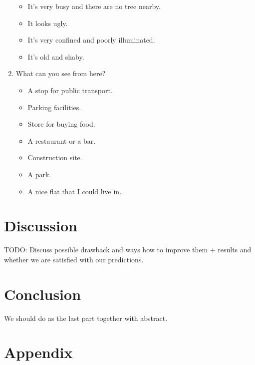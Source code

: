 \documentclass[letterpaper]{article}
\begin{document}
\begin{enumerate}
\begin{itemize}
		\item It's very busy and there are no tree nearby.
		\item It looks ugly.
		\item It's very confined and poorly illuminated.
		\item It's old and shaby.
	\end{itemize}
	\item What can you see from here?
	\begin{itemize}
		\item A stop for public transport.
		\item Parking facilities.
		\item Store for buying food.
		\item A restaurant or a bar.
		\item Construction site.
		\item A park.
		\item A nice flat that I could live in.
	\end{itemize}
\end{enumerate}



\section{Discussion}\label{sec:discussion}
TODO: Discuss possible drawback and ways how to improve them + results and whether we are satisfied with our predictions.

\section{Conclusion}\label{sec:conclusion}
We should do as the last part together with abstract.




\section{Appendix}
\end{document}
